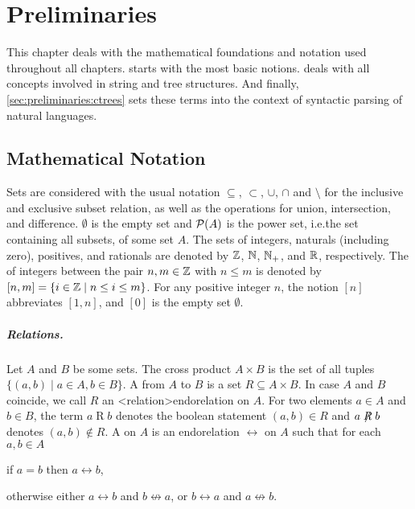\documentclass[../document.tex]{subfiles}
\begin{document}
    \chapter{Preliminaries}\label{chap:preliminaries}
    This chapter deals with the mathematical foundations and notation used throughout all chapters.
     starts with the most basic notions.
     deals with all concepts involved in string and tree structures.
    And finally, \cref{sec:preliminaries:ctrees} sets these terms into the context of syntactic parsing of natural languages.


    \section{Mathematical Notation}\label{sec:preliminaries:math}
    Sets are considered with the usual notation \(\subseteq\), \(\subset\), \(\cup\), \(\cap\) and \(\setminus\) for the inclusive and exclusive subset relation, as well as the operations for union, intersection, and difference.
    \(\emptyset\) is the empty set and \(\mathcal{P}(A)\) is the power set, i.e.\@ the set containing all subsets, of some set \(A\).
    The sets of integers, naturals (including zero), positives, and rationals are denoted by $\mathbb{Z}$, $\mathbb{N}$, $\mathbb{N}_+$, and $\mathbb{R}$, respectively.
    The  of integers between the pair \(n, m \in \mathbb{Z}\) with \(n \leq m\) is denoted by \([n,m] = \{i \in \mathbb{Z} \mid n \leq i \leq m\}\).
    For any positive integer \(n\), the notion \([n]\) abbreviates \([1,n]\), and \([0]\) is the empty set \(\emptyset\).

    \paragraph{Relations.}
    Let \(A\) and \(B\) be some sets.
    The cross product \(A \times B\) is the set of all tuples \(\{(a,b) \mid a \in A, b\in B\}\).
    A  from \(A\) to \(B\) is a set \(R \subseteq A \times B\).
    In case \(A\) and \(B\) coincide, we call \(R\) an <relation>{endorelation} on \(A\).
    For two elements \(a \in A\) and \(b \in B\), the term \(a \mathrel{R} b\) denotes the boolean statement \((a,b) \in R\) and \(a \not\mathrel{R} b\) denotes \((a,b) \notin R\).
    A  on \(A\) is an endorelation \(\rel\) on \(A\) such that for each \(a, b \in A\)
    \begin{inparaenum}
        \item if \(a = b\) then \(a \rel b\),
        \item otherwise either \(a \rel b\) and \(b \not\rel a\), or \(b \rel a\) and \(a \not\rel b\).
    \end{inparaenum}
\end{document}
